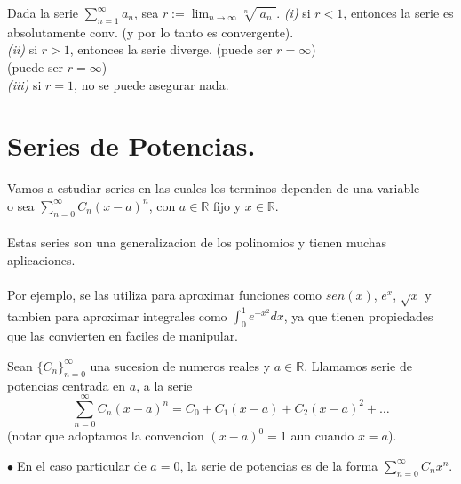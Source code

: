 \documentclass{article}
\theoremstyle{definition}
\theoremstyle{definition}
\theoremstyle{remark}
\newcommand\bl{$\bullet\;$}
\begin{document}
\begin{teo} Dada la serie $\sum_{n=1}^{\infty}{a_n}$, sea $r:=\lim_{n\to\infty}{\sqrt[n]{|a_n|}}.$
  \emph{(i)\phantom{ii}} \quad si $r<1$, entonces la serie es absolutamente conv. (y por lo tanto es convergente). \\
  \emph{(ii)\phantom{i}} \quad si $r>1$, entonces la serie diverge. (puede ser $r=\infty$)\\(puede ser $r=\infty$) \\
  \emph{(iii)} \quad si $r=1$, no se puede asegurar nada.
\end{teo}

\section{Series de Potencias.}

Vamos a estudiar series en las cuales los terminos dependen de una variable \\ o sea $\sum_{n=0}^{\infty}{C_n (x-a)^n}$, con $a \in \mathbb{R}$ fijo y $x \in \mathbb{R}$.
\\\\
Estas series son una generalizacion de los polinomios y tienen muchas aplicaciones.
\\\\
Por ejemplo, se las utiliza para aproximar funciones como $sen(x)$, $e^x$, $\sqrt{x}$ y tambien para aproximar integrales como $\int_{0}^{1}{e^{-x^2}dx}$, ya que tienen propiedades que las convierten en faciles de manipular.
\pagebreak 
\begin{defi}
  Sean $\{C_n\}_{n=0}^{\infty}$ una sucesion de numeros reales y $a \in \mathbb{R}$. Llamamos serie de potencias centrada en $a$, a la serie 
  \[ 
  \sum_{n=0}^{\infty}{C_n(x-a)^n} = C_0+C_1(x-a)+C_2(x-a)^2+\dots 
  \]
  (notar que adoptamos la convencion $(x-a)^0=1$ aun cuando $x=a$).
\end{defi}
\bl En el caso particular de $a=0$, la serie de potencias es de la forma $\sum_{n=0}^{\infty}{C_nx^n}$. 
\end{document}
